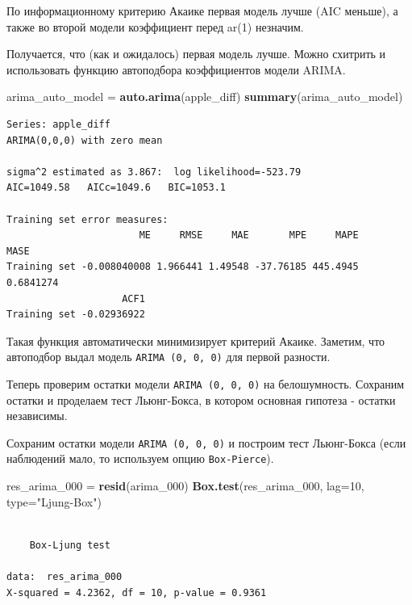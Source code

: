 \documentclass[]{book}
\newenvironment{Shaded}{\begin{snugshade}}{\end{snugshade}}
\newcommand{\DataTypeTok}[1]{\textcolor[rgb]{0.13,0.29,0.53}{#1}}
\newcommand{\DecValTok}[1]{\textcolor[rgb]{0.00,0.00,0.81}{#1}}
\newcommand{\KeywordTok}[1]{\textcolor[rgb]{0.13,0.29,0.53}{\textbf{#1}}}
\newcommand{\NormalTok}[1]{#1}
\newcommand{\StringTok}[1]{\textcolor[rgb]{0.31,0.60,0.02}{#1}}
\begin{document}
По информационному критерию Акаике первая модель лучше (AIC меньше), а также во второй модели коэффициент перед ar(1) незначим.

Получается, что (как и ожидалось) первая модель лучше.
Можно схитрить и использовать функцию автоподбора коэффициентов модели ARIMA.

\begin{Shaded}
\begin{Highlighting}[]
\NormalTok{arima_auto_model =}\StringTok{ }\KeywordTok{auto.arima}\NormalTok{(apple_diff)}
\KeywordTok{summary}\NormalTok{(arima_auto_model)}
\end{Highlighting}
\end{Shaded}

\begin{verbatim}
Series: apple_diff 
ARIMA(0,0,0) with zero mean 

sigma^2 estimated as 3.867:  log likelihood=-523.79
AIC=1049.58   AICc=1049.6   BIC=1053.1

Training set error measures:
                       ME     RMSE     MAE       MPE     MAPE      MASE
Training set -0.008040008 1.966441 1.49548 -37.76185 445.4945 0.6841274
                    ACF1
Training set -0.02936922
\end{verbatim}

Такая функция автоматически минимизирует критерий Акаике. Заметим, что автоподбор выдал модель \texttt{ARIMA\ (0,\ 0,\ 0)} для первой разности.

Теперь проверим остатки модели \texttt{ARIMA\ (0,\ 0,\ 0)} на белошумность. Сохраним остатки и проделаем тест Льюнг-Бокса, в котором основная гипотеза - остатки независимы.

Сохраним остатки модели \texttt{ARIMA\ (0,\ 0,\ 0)} и построим тест Льюнг-Бокса (если наблюдений мало, то используем опцию \texttt{Box-Pierce}).

\begin{Shaded}
\begin{Highlighting}[]
\NormalTok{res_arima_}\DecValTok{000}\NormalTok{ =}\StringTok{ }\KeywordTok{resid}\NormalTok{(arima_}\DecValTok{000}\NormalTok{)}
\KeywordTok{Box.test}\NormalTok{(res_arima_}\DecValTok{000}\NormalTok{, }\DataTypeTok{lag=}\DecValTok{10}\NormalTok{, }\DataTypeTok{type=}\StringTok{"Ljung-Box"}\NormalTok{)}
\end{Highlighting}
\end{Shaded}

\begin{verbatim}

    Box-Ljung test

data:  res_arima_000
X-squared = 4.2362, df = 10, p-value = 0.9361
\end{verbatim}
\end{document}
